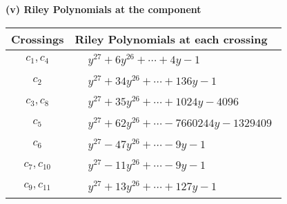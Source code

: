 \documentclass[1p]{elsarticle_modified}
\theoremstyle{definition}
\begin{document}
\newpage\renewcommand{\arraystretch}{1}
\flushleft \textbf{(v) Riley Polynomials at the component}\newline \\
\begin{tabular}{m{50pt}|m{274pt}}
Crossings & \hspace{64pt}Riley Polynomials at each crossing \\
\hline $$\begin{aligned}c_{1},c_{4}\end{aligned}$$&$\begin{aligned}
&y^{27}+6 y^{26}+\cdots+4 y-1
\end{aligned}$\\
\hline $$\begin{aligned}c_{2}\end{aligned}$$&$\begin{aligned}
&y^{27}+34 y^{26}+\cdots+136 y-1
\end{aligned}$\\
\hline $$\begin{aligned}c_{3},c_{8}\end{aligned}$$&$\begin{aligned}
&y^{27}+35 y^{26}+\cdots+1024 y-4096
\end{aligned}$\\
\hline $$\begin{aligned}c_{5}\end{aligned}$$&$\begin{aligned}
&y^{27}+62 y^{26}+\cdots-7660244 y-1329409
\end{aligned}$\\
\hline $$\begin{aligned}c_{6}\end{aligned}$$&$\begin{aligned}
&y^{27}-47 y^{26}+\cdots-9 y-1
\end{aligned}$\\
\hline $$\begin{aligned}c_{7},c_{10}\end{aligned}$$&$\begin{aligned}
&y^{27}-11 y^{26}+\cdots-9 y-1
\end{aligned}$\\
\hline $$\begin{aligned}c_{9},c_{11}\end{aligned}$$&$\begin{aligned}
&y^{27}+13 y^{26}+\cdots+127 y-1
\end{aligned}$\\
\hline
\end{tabular}\\~\\
\end{document}

